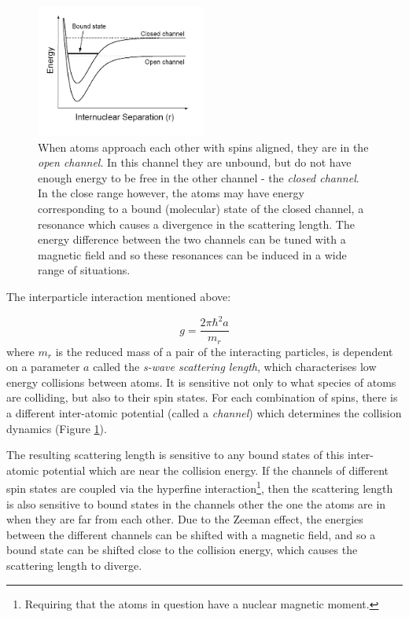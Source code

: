 \begin{figure}%
\begin{center}
\includegraphics[width=0.5\textwidth]{figures/unsorted/feshbach.png}
\caption{When atoms approach each other with spins aligned, they are in the \emph{open channel}. In this channel they are unbound, but do not have enough energy to be free in the other channel - the \emph{closed channel}. In the close range however, the atoms may have energy corresponding to a bound (molecular) state of the closed channel, a resonance which causes a divergence in the scattering length. The energy difference between the two channels can be tuned with a magnetic field and so these resonances can be induced in a wide range of situations.}\label{fig:feshbach}
\end{center}
\end{figure}
The interparticle interaction mentioned above:

\begin{equation}
g = \frac{2\pi \hbar^2 a}{m_r}
\end{equation}
where $m_r$ is the reduced mass of a pair of the interacting particles, is dependent on a parameter $a$ called the \emph{s-wave scattering length}, which characterises low energy collisions between atoms. It is sensitive not only to what species of atoms are colliding, but also to their spin states. For each combination of spins, there is a different inter-atomic potential (called a \emph{channel}) which determines the collision dynamics (Figure \ref{fig:feshbach}).

The resulting scattering length is sensitive to any bound states of this inter-atomic potential which are near the collision energy. If the channels of different spin states are coupled via the hyperfine interaction\footnote{Requiring that the atoms in question have a nuclear magnetic moment.}, then the scattering length is also sensitive to bound states in the channels other the one the atoms are in when they are far from each other. Due to the Zeeman effect, the energies between the different channels can be shifted with a magnetic field, and so a bound state can be shifted close to the collision energy, which causes the scattering length to diverge.

